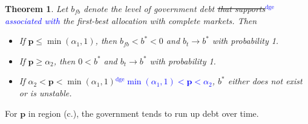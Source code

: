 \documentclass[12pt]{article}
\newcommand{\dge}[1]{\textcolor{blue}{$^{\textrm{dge}}${#1}}}
\newtheorem{theorem}{Theorem}[section]
\begin{document}
	

 	\begin{theorem}
Let %
$b_{fb}$ denote the level of  government  debt \st{that  supports}\dge{associated with} the first-best allocation with complete markets.
  Then %
		\begin{itemize}
			\item[a.]  If $\bm{p}\leq\min(\alpha_1,1)$, then  $b_{fb}<b^*<0$ and $b_t\rightarrow b^*$ with probability 1.
			\item[b.] If $\bm{p} \geq \alpha_2$, then   $0<b^*$ and $b_t \rightarrow b^*$ with probability 1.
            \item[c.] If \st{$\alpha_2 < \bm{p} < \min	(\alpha_1,1)$}\dge{$ \min(\alpha_1,1)<\bm{p}<\alpha_2 $},   $b^*$ either does not exist or is unstable.
									\end{itemize}			\end{theorem}
  For $\bm{p}$ in region (c.),
the government tends to run up debt over time.
\end{document}
